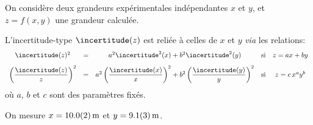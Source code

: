 
\finEntrainement






\bigskip

\begin{prerequis}
On considère deux grandeurs expérimentales indépendantes $x$ et $y$, et $z=f(x,y)$ une grandeur calculée. 
\smallskip

L'incertitude-type $\incertitude(z)$ est reliée à celles de $x$ et $y$ \emph{via} les relations:
$$
\begin{array}{ccccc}
\incertitude(z)^2		
&=&a^2\incertitude^2(x)+b^2\incertitude^2(y)		
&\text{si}		
&z=ax+by	\\[3mm]

\left(\dfrac{\incertitude(z)}{z}\right)^2
&=&a^2\left(\dfrac{\incertitude(x)}{x}\right)^2+b^2\left(\dfrac{\incertitude(y)}{y}\right)^2	
&\text{si}	
&z=c\,x^ay^b
\end{array}
$$
où $a$, $b$  et $c$ sont des paramètres fixés.
\end{prerequis}




\hauteurLargeurCadreReponse		{6mm}{2.5cm}
\initialisationEntrainement


On mesure $x=\SI{10.0\pm0.2}{m}$ et $y=\SI{9.1\pm0.3}{m}$. 
\smallskip

